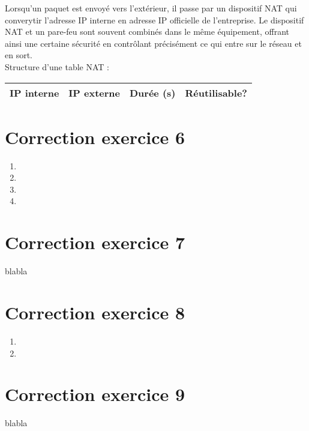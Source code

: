 \documentclass[a4paper, 11pt, titlepage]{article}
\begin{document}
Lorsqu'un paquet est envoyé vers l'extérieur, il passe par un dispositif NAT qui converytir l'adresse IP interne en adresse IP officielle de l'entreprise. Le dispositif NAT et un pare-feu sont souvent combinés dans le même équipement, offrant ainsi une certaine sécurité en contrôlant précisément ce qui entre sur le réseau et en sort.\\

Structure d'une table NAT : \\
\begin{tabular}{|c|c|c|c|}
  \hline
  IP interne & IP externe & Durée (s) & Réutilisable?  \\
  \hline
\end{tabular}

\section{Correction exercice 6}
\begin{enumerate}[label=(\alph*)]
\item

\item 

\item 

\item 

\end{enumerate}

\section{Correction exercice 7}

blabla

\section{Correction exercice 8}
\begin{enumerate}[label=(\alph*)]
\item

\item 


\end{enumerate}

\section{Correction exercice 9}

blabla
\end{document}
